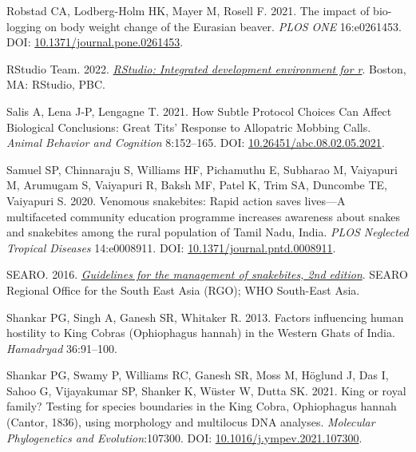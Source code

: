 \documentclass[10pt,a4paper]{article}
\newlength{\cslhangindent}
\newenvironment{CSLReferences}[2] %
 {\begin{list}{}{%
  \setlength{\itemindent}{0pt}
  \setlength{\leftmargin}{0pt}
  \setlength{\parsep}{0pt}
  \ifodd #1
   \setlength{\leftmargin}{\cslhangindent}
   \setlength{\itemindent}{-1\cslhangindent}
  \fi
  \setlength{\itemsep}{#2\baselineskip}}}
 {\end{list}}
\begin{document}
\begin{CSLReferences}{1}{0}
Robstad CA, Lodberg-Holm HK, Mayer M, Rosell F. 2021. The impact of bio-logging on body weight change of the {Eurasian} beaver. \emph{PLOS ONE} 16:e0261453. DOI: \href{https://doi.org/10.1371/journal.pone.0261453}{10.1371/journal.pone.0261453}.

RStudio Team. 2022. \emph{\href{http://www.rstudio.com/}{{RStudio}: Integrated development environment for r}}. Boston, MA: RStudio, PBC.

Salis A, Lena J-P, Lengagne T. 2021. How {Subtle} {Protocol} {Choices} {Can} {Affect} {Biological} {Conclusions}: {Great} {Tits}' {Response} to {Allopatric} {Mobbing} {Calls}. \emph{Animal Behavior and Cognition} 8:152--165. DOI: \href{https://doi.org/10.26451/abc.08.02.05.2021}{10.26451/abc.08.02.05.2021}.

Samuel SP, Chinnaraju S, Williams HF, Pichamuthu E, Subharao M, Vaiyapuri M, Arumugam S, Vaiyapuri R, Baksh MF, Patel K, Trim SA, Duncombe TE, Vaiyapuri S. 2020. Venomous snakebites: {Rapid} action saves lives---{A} multifaceted community education programme increases awareness about snakes and snakebites among the rural population of {Tamil} {Nadu}, {India}. \emph{PLOS Neglected Tropical Diseases} 14:e0008911. DOI: \href{https://doi.org/10.1371/journal.pntd.0008911}{10.1371/journal.pntd.0008911}.

SEARO. 2016. \emph{\href{https://www.who.int/publications/i/item/9789290225300}{Guidelines for the management of snakebites, 2nd edition}}. SEARO Regional Office for the South East Asia (RGO); WHO South-East Asia.

Shankar PG, Singh A, Ganesh SR, Whitaker R. 2013. Factors influencing human hostility to {King} {Cobras} ({Ophiophagus} hannah) in the {Western} {Ghats} of {India}. \emph{Hamadryad} 36:91--100.

Shankar PG, Swamy P, Williams RC, Ganesh SR, Moss M, Höglund J, Das I, Sahoo G, Vijayakumar SP, Shanker K, Wüster W, Dutta SK. 2021. King or royal family? {Testing} for species boundaries in the {King} {Cobra}, {Ophiophagus} hannah ({Cantor}, 1836), using morphology and multilocus {DNA} analyses. \emph{Molecular Phylogenetics and Evolution}:107300. DOI: \href{https://doi.org/10.1016/j.ympev.2021.107300}{10.1016/j.ympev.2021.107300}.


\end{CSLReferences}
\end{document}
